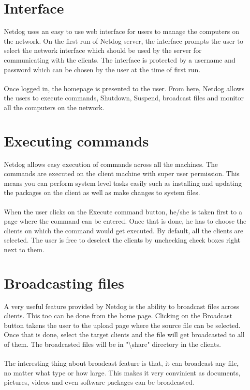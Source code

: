 \section{Interface}

Netdog uses an easy to use web interface for users to manage the computers on
the network. On the first run of Netdog server, the interface prompts the user
to select the network interface which should be used by the server for
communicating with the clients. The interface is protected by a username and
password which can be chosen by the user at the time of first run.
\\\\
Once logged in, the homepage is presented to the user. From here, Netdog allows
the users to execute commands, Shutdown, Suspend, broadcast files and monitor
all the computers on the network.

\section{Executing commands}

Netdog allows easy execution of commands across all the machines. The commands
are executed on the client machine with super user permission. This means you
can perform system level tasks easily such as installing and updating the
packages on the client as well as make changes to system files.
\\\\
When the user clicks on the Execute command button, he/she is taken first to a
page where the command can be entered. Once that is done, he has to choose the
clients on which the command would get executed. By default, all the clients
are selected. The user is free to deselect the clients by unchecking check
boxes right next to them.

\section{Broadcasting files}

A very useful feature provided by Netdog is the ability to broadcast files
across clients. This too can be done from the home page. Clicking on the
Broadcast button takens the user to the upload page where the source file can
be selected. Once that is done, select the target clients and the file will get
broadcasted to all of them. The broadcasted files will be in
"\textbackslash share" directory in the clients.
\\\\
The interesting thing about broadcast feature is that, it can broadcast any
file, no matter what type or how large. This makes it very convinient as
documents, pictures, videos and even software packages can be broadcasted.

